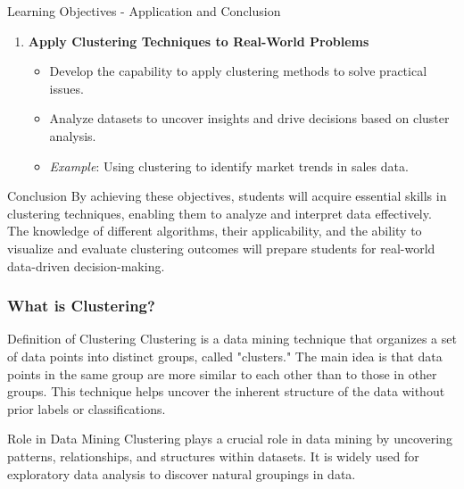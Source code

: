 \documentclass[aspectratio=169]{beamer}
\begin{document}
\begin{frame}[fragile]{Learning Objectives - Application and Conclusion}
  \begin{enumerate}[resume]
    \item \textbf{Apply Clustering Techniques to Real-World Problems}
      \begin{itemize}
        \item Develop the capability to apply clustering methods to solve practical issues.
        \item Analyze datasets to uncover insights and drive decisions based on cluster analysis.
        \item \emph{Example}: Using clustering to identify market trends in sales data.
      \end{itemize}
  \end{enumerate}

  \begin{block}{Conclusion}
    By achieving these objectives, students will acquire essential skills in clustering techniques, enabling them to analyze and interpret data effectively. The knowledge of different algorithms, their applicability, and the ability to visualize and evaluate clustering outcomes will prepare students for real-world data-driven decision-making.
  \end{block}
\end{frame}

\begin{frame}[fragile]
    \frametitle{What is Clustering?}
    
    \begin{block}{Definition of Clustering}
        Clustering is a data mining technique that organizes a set of data points into distinct groups, called "clusters." 
        The main idea is that data points in the same group are more similar to each other than to those in other groups. 
        This technique helps uncover the inherent structure of the data without prior labels or classifications.
    \end{block}

    \begin{block}{Role in Data Mining}
        Clustering plays a crucial role in data mining by uncovering patterns, relationships, and structures within datasets. 
        It is widely used for exploratory data analysis to discover natural groupings in data.
    \end{block}
\end{frame}
\end{document}
